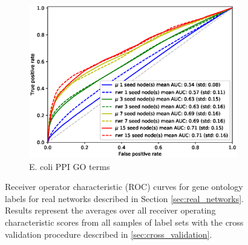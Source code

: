 \documentclass[sigconf]{acmart}
\begin{document}
\begin{figure}[t]
\begin{subfigure}[b]{0.31\textwidth}
    \end{subfigure}
    \begin{subfigure}[b]{0.31\textwidth}
        \centering
        \includegraphics[width=\textwidth]{images/rocs/ecoli_ppi_amigo.eps}
        \caption{E. coli PPI GO terms}
    \end{subfigure}
    \caption{Receiver operator characteristic (ROC) curves for gene ontology labels for real networks described in Section \ref{sec:real_networks}. 
    Results represent the averages over all receiver operating characteristic scores from all samples of label sets with the cross validation procedure described in \ref{sec:cross_validation}.}
    \label{fig:GO_TERM_ROCS}
\end{figure}

\end{document}

